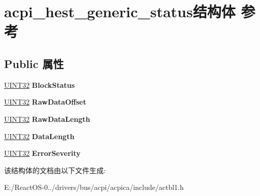\hypertarget{structacpi__hest__generic__status}{}\section{acpi\+\_\+hest\+\_\+generic\+\_\+status结构体 参考}
\label{structacpi__hest__generic__status}
\subsection*{Public 属性}
\begin{DoxyCompactItemize}
\item 
\mbox{\label{structacpi__hest__generic__status_a78a3c6fb3b7a43a430c450532e069425}} 
\hyperlink{_processor_bind_8h_ae1e6edbbc26d6fbc71a90190d0266018}{U\+I\+N\+T32} {\bfseries Block\+Status}
\item 
\mbox{\label{structacpi__hest__generic__status_aa0adc0484f348cf0623d2475608ebc6c}} 
\hyperlink{_processor_bind_8h_ae1e6edbbc26d6fbc71a90190d0266018}{U\+I\+N\+T32} {\bfseries Raw\+Data\+Offset}
\item 
\mbox{\label{structacpi__hest__generic__status_aeedaf4113ed934f72ef70fcc4318312a}} 
\hyperlink{_processor_bind_8h_ae1e6edbbc26d6fbc71a90190d0266018}{U\+I\+N\+T32} {\bfseries Raw\+Data\+Length}
\item 
\mbox{\label{structacpi__hest__generic__status_a5b61e65e3cbf07cc3bd4ff55a2a25a78}} 
\hyperlink{_processor_bind_8h_ae1e6edbbc26d6fbc71a90190d0266018}{U\+I\+N\+T32} {\bfseries Data\+Length}
\item 
\mbox{\label{structacpi__hest__generic__status_a47f278712ef40efef950089b83d124b4}} 
\hyperlink{_processor_bind_8h_ae1e6edbbc26d6fbc71a90190d0266018}{U\+I\+N\+T32} {\bfseries Error\+Severity}
\end{DoxyCompactItemize}


该结构体的文档由以下文件生成\+:\begin{DoxyCompactItemize}
\item 
E\+:/\+React\+O\+S-\/0../drivers/bus/acpi/acpica/include/actbl1.\+h\end{DoxyCompactItemize}
